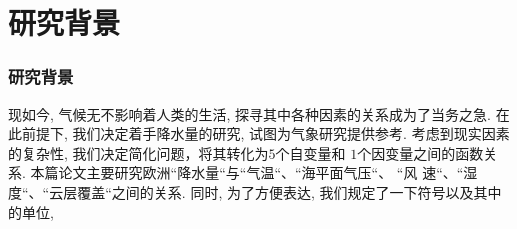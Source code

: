 \documentclass[10pt]{beamer}
\begin{document}
\section{研究背景}
\begin{frame}
\frametitle{研究背景}
\begin{block}
现如今, 气候无不影响着人类的生活, 探寻其中各种因素的关系成为了当务之急.
在此前提下, 我们决定着手降水量的研究, 试图为气象研究提供参考.
考虑到现实因素的复杂性, 我们决定简化问题，将其转化为$5$个自变量和
 $1$个因变量之间的函数关系.
本篇论文主要研究欧洲``降水量``与``气温``、``海平面气压``、 ``风
速``、``湿度``、``云层覆盖``之间的关系.
同时, 为了方便表达, 我们规定了一下符号以及其中的单位,
\end{block}
\end{frame}
\end{document}
